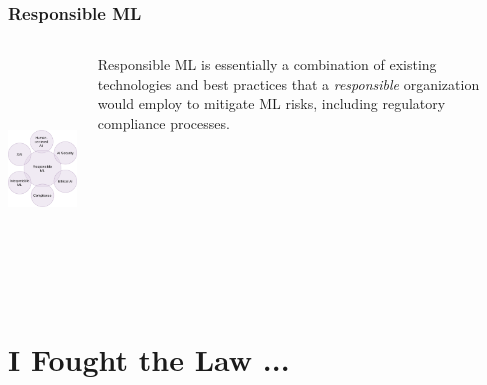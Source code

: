 \documentclass[11pt,
               aspectratio=169,
               hyperref={colorlinks}
               ]{beamer}
\begin{document}
	\begin{frame}
	
	\frametitle{Responsible ML}
		
		\begin{columns}
				
			\centering
			\includegraphics[height=170pt]{img/responsible_ml.png}
			
			\noindent Responsible ML is essentially a combination of existing technologies and best practices that a \textit{responsible} organization would employ to mitigate ML risks, including regulatory compliance processes.
			
			\end{columns}
		
	\end{frame}

	\section{I Fought the Law ...}

\end{document}
